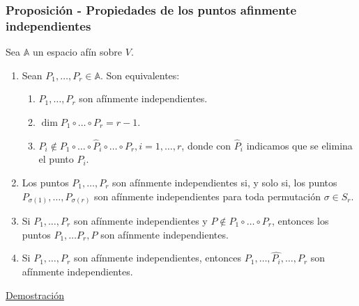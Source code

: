 \documentclass[12pt, a4paper, ones, notitlepage, openany,titlepage]{article}
\newcommand{\demostracion}{\noindent\underline{Demostración}}
\begin{document}
\subsubsection{Proposición - Propiedades de los puntos afinmente independientes}
\noindent Sea $\mathbb{A}$ un espacio afín sobre $V$.
\begin{enumerate}[label=(\arabic*)]
\item Sean $P_{1}, \ldots, P_{r} \in \mathbb{A}$. Son equivalentes:
\begin{enumerate}[label=(\alph*)]
	\item $P_{1}, \ldots, P_{r}$ son afínmente independientes.

	\item $\dim  P_{1} \circ \ldots \circ P_{r}=r-1$.

	\item $P_{i} \notin P_{1} \circ \ldots \circ \widehat{P}_{i} \circ \ldots \circ P_{r}, i=1, \ldots, r$, donde con $\widehat{P}_{i}$ indicamos que se elimina el punto $P_{i}$.
\end{enumerate}

\item Los puntos $P_{1}, \ldots, P_{r}$ son afínmente independientes si, y solo si, los puntos $P_{\sigma(1)}, \ldots, P_{\sigma(r)}$ son afínmente independientes para toda permutación $\sigma \in S_{r}$.

\item Si $P_1,\ldots,P_r$ son afínmente independientes y $P \notin P_1 \circ \ldots \circ P_r$, entonces los puntos $P_1, \ldots P_r, P$ son afínmente independientes.

\item Si $P_1, \ldots, P_r$ son afínmente independientes, entonces $P_1, \ldots, \widehat{P_i}, \ldots, P_r$ son afínmente independientes.
\end{enumerate}
\demostracion
\end{document}
